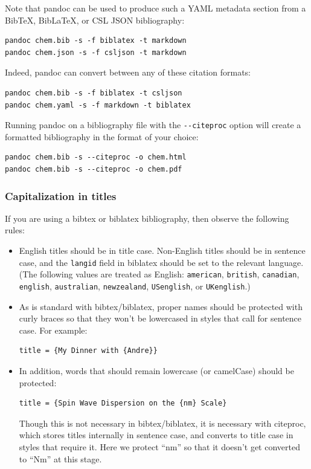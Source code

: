 \documentclass[
]{article}
\begin{document}
Note that pandoc can be used to produce such a YAML metadata section
from a BibTeX, BibLaTeX, or CSL JSON bibliography:

\begin{verbatim}
pandoc chem.bib -s -f biblatex -t markdown
pandoc chem.json -s -f csljson -t markdown
\end{verbatim}

Indeed, pandoc can convert between any of these citation formats:

\begin{verbatim}
pandoc chem.bib -s -f biblatex -t csljson
pandoc chem.yaml -s -f markdown -t biblatex
\end{verbatim}

Running pandoc on a bibliography file with the \texttt{-\/-citeproc}
option will create a formatted bibliography in the format of your
choice:

\begin{verbatim}
pandoc chem.bib -s --citeproc -o chem.html
pandoc chem.bib -s --citeproc -o chem.pdf
\end{verbatim}

\hypertarget{capitalization-in-titles}{%
\subsubsection{Capitalization in
titles}\label{capitalization-in-titles}}

If you are using a bibtex or biblatex bibliography, then observe the
following rules:

\begin{itemize}
\item
  English titles should be in title case. Non-English titles should be
  in sentence case, and the \texttt{langid} field in biblatex should be
  set to the relevant language. (The following values are treated as
  English: \texttt{american}, \texttt{british}, \texttt{canadian},
  \texttt{english}, \texttt{australian}, \texttt{newzealand},
  \texttt{USenglish}, or \texttt{UKenglish}.)
\item
  As is standard with bibtex/biblatex, proper names should be protected
  with curly braces so that they won't be lowercased in styles that call
  for sentence case. For example:

\begin{verbatim}
title = {My Dinner with {Andre}}
\end{verbatim}
\item
  In addition, words that should remain lowercase (or camelCase) should
  be protected:

\begin{verbatim}
title = {Spin Wave Dispersion on the {nm} Scale}
\end{verbatim}

  Though this is not necessary in bibtex/biblatex, it is necessary with
  citeproc, which stores titles internally in sentence case, and
  converts to title case in styles that require it. Here we protect
  ``nm'' so that it doesn't get converted to ``Nm'' at this stage.
\end{itemize}
\end{document}
